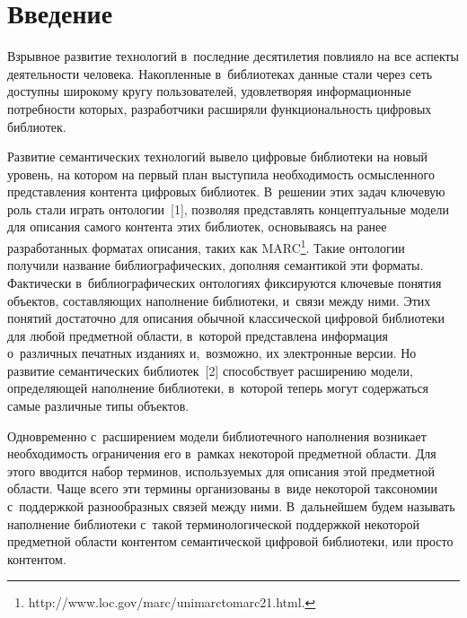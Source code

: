 



\thispagestyle{headings}

\begin{multicols}{2}

\label{st\stat}

\section{Введение}

     Взрывное развитие технологий в~последние десятилетия повлияло на 
все аспекты деятельности человека. Накопленные в~библиотеках данные 
стали через сеть доступны широкому кругу пользователей, удовлетворяя 
информационные потребности которых, разработчики расширяли 
функциональность цифровых библиотек. 
     
     Развитие семантических технологий вывело циф\-ро\-вые библиотеки на 
новый уровень, на котором на первый план выступила необходимость 
осмыс\-лен\-но\-го представления контента цифровых биб\-лио\-тек. В~решении этих 
задач ключевую роль стали играть онтологии~[1], позволяя представлять 
концептуальные модели для описания самого контента этих библиотек, 
основываясь на ранее разработанных форматах описания, таких как 
MARC\footnote[3]{{\sf http://www.loc.gov/marc/unimarctomarc21.html.}}. Такие 
онтологии получили название библиографических, дополняя семантикой эти 
форматы. Фактически в~библиографических онтологиях фиксируются 
ключевые понятия объектов, составляющих наполнение библиотеки, и~связи 
между ними. Этих понятий достаточно для описания обычной классической 
цифровой библиотеки для любой предметной области, в~которой 
представлена информация о~различных печатных изданиях и,~возможно, их 
электронные версии. Но развитие семантических библиотек~[2] способствует 
расширению модели, определяющей наполнение библиотеки, в~которой 
теперь могут содержаться самые различные типы объектов. 
     
     Одновременно с~расширением модели биб\-ли\-о\-теч\-но\-го наполнения 
возникает необходимость ограничения его в~рамках некоторой предметной 
области. Для этого вводится набор терминов, используемых для описания 
этой предметной об\-ласти. Чаще всего эти термины организованы в~виде 
некоторой таксономии с~поддержкой разнообразных связей между ними. 
В~дальнейшем будем называть наполнение библиотеки с~такой 
терминологической поддержкой некоторой предметной области контентом 
семантической цифровой библиотеки, или просто контентом.
     

\end{multicols}
